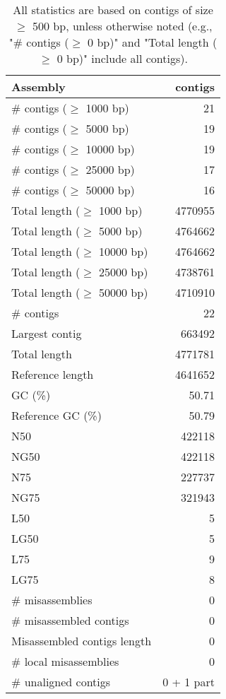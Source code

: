 \documentclass[12pt,a4paper]{article}
\begin{document}
\begin{table}[ht]
\begin{center}
\caption{All statistics are based on contigs of size $\geq$ 500 bp, unless otherwise noted (e.g., "\# contigs ($\geq$ 0 bp)" and "Total length ($\geq$ 0 bp)" include all contigs).}
\begin{tabular}{|l*{1}{|r}|}
\hline
Assembly & contigs \\ \hline
\# contigs ($\geq$ 1000 bp) & 21 \\ \hline
\# contigs ($\geq$ 5000 bp) & 19 \\ \hline
\# contigs ($\geq$ 10000 bp) & 19 \\ \hline
\# contigs ($\geq$ 25000 bp) & 17 \\ \hline
\# contigs ($\geq$ 50000 bp) & 16 \\ \hline
Total length ($\geq$ 1000 bp) & 4770955 \\ \hline
Total length ($\geq$ 5000 bp) & 4764662 \\ \hline
Total length ($\geq$ 10000 bp) & 4764662 \\ \hline
Total length ($\geq$ 25000 bp) & 4738761 \\ \hline
Total length ($\geq$ 50000 bp) & 4710910 \\ \hline
\# contigs & 22 \\ \hline
Largest contig & 663492 \\ \hline
Total length & 4771781 \\ \hline
Reference length & 4641652 \\ \hline
GC (\%) & 50.71 \\ \hline
Reference GC (\%) & 50.79 \\ \hline
N50 & 422118 \\ \hline
NG50 & 422118 \\ \hline
N75 & 227737 \\ \hline
NG75 & 321943 \\ \hline
L50 & 5 \\ \hline
LG50 & 5 \\ \hline
L75 & 9 \\ \hline
LG75 & 8 \\ \hline
\# misassemblies & 0 \\ \hline
\# misassembled contigs & 0 \\ \hline
Misassembled contigs length & 0 \\ \hline
\# local misassemblies & 0 \\ \hline
\# unaligned contigs & 0 + 1 part \\ \hline

\end{tabular}
\end{center}
\end{table}
\end{document}
